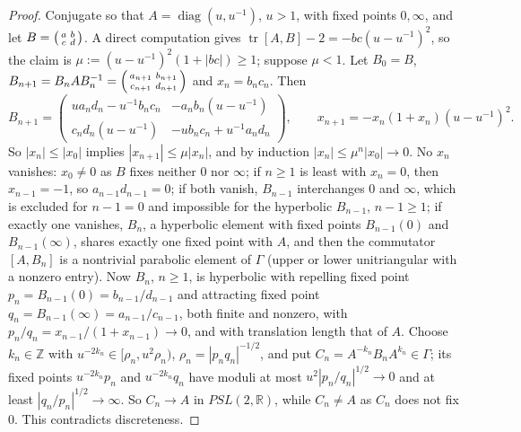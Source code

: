 \documentclass[pdflatex,sn-mathphys-num]{sn-jnl}
\theoremstyle{thmstyleone}%
\theoremstyle{thmstylethree}%
\newcommand{\tr}{\operatorname{tr}}
\newcommand{\R}{\mathbb{R}}
\newcommand{\Z}{\mathbb{Z}}
\begin{document}
\begin{proof}
Conjugate so that $A=\operatorname{diag}(u,u^{-1})$, $u>1$, with fixed points $0,\infty$, and let $B=\begin{psmallmatrix}a&b\\c&d\end{psmallmatrix}$. A direct computation gives $\tr[A,B]-2=-bc(u-u^{-1})^2$, so the claim is $\mu:=(u-u^{-1})^2(1+|bc|)\ge1$; suppose $\mu<1$. Let $B_0=B$, $B_{n+1}=B_nAB_n^{-1}=\begin{psmallmatrix}a_{n+1}&b_{n+1}\\c_{n+1}&d_{n+1}\end{psmallmatrix}$ and $x_n=b_nc_n$. Then
\[
  B_{n+1}=\begin{pmatrix}ua_nd_n-u^{-1}b_nc_n&-a_nb_n(u-u^{-1})\\c_nd_n(u-u^{-1})&-ub_nc_n+u^{-1}a_nd_n\end{pmatrix},\qquad x_{n+1}=-x_n(1+x_n)(u-u^{-1})^2 .
\]
So $|x_n|\le|x_0|$ implies $|x_{n+1}|\le\mu|x_n|$, and by induction $|x_n|\le\mu^n|x_0|\to0$. No $x_n$ vanishes: $x_0\ne0$ as $B$ fixes neither $0$ nor $\infty$; if $n\ge1$ is least with $x_n=0$, then $x_{n-1}=-1$, so $a_{n-1}d_{n-1}=0$; if both vanish, $B_{n-1}$ interchanges $0$ and $\infty$, which is excluded for $n-1=0$ and impossible for the hyperbolic $B_{n-1}$, $n-1\ge1$; if exactly one vanishes, $B_n$, a hyperbolic element with fixed points $B_{n-1}(0)$ and $B_{n-1}(\infty)$, shares exactly one fixed point with $A$, and then the commutator $[A,B_n]$ is a nontrivial parabolic element of $\Gamma$ (upper or lower unitriangular with a nonzero entry). Now $B_n$, $n\ge1$, is hyperbolic with repelling fixed point $p_n=B_{n-1}(0)=b_{n-1}/d_{n-1}$ and attracting fixed point $q_n=B_{n-1}(\infty)=a_{n-1}/c_{n-1}$, both finite and nonzero, with $p_n/q_n=x_{n-1}/(1+x_{n-1})\to0$, and with translation length that of $A$. Choose $k_n\in\Z$ with $u^{-2k_n}\in[\rho_n,u^2\rho_n)$, $\rho_n=|p_nq_n|^{-1/2}$, and put $C_n=A^{-k_n}B_nA^{k_n}\in\Gamma$; its fixed points $u^{-2k_n}p_n$ and $u^{-2k_n}q_n$ have moduli at most $u^2|p_n/q_n|^{1/2}\to0$ and at least $|q_n/p_n|^{1/2}\to\infty$. So $C_n\to A$ in $PSL(2,\R)$, while $C_n\ne A$ as $C_n$ does not fix $0$. This contradicts discreteness.
\end{proof}
\end{document}
